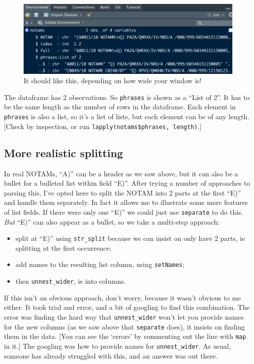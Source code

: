 \documentclass[
]{book}
\providecommand{\tightlist}{%
  \setlength{\itemsep}{0pt}\setlength{\parskip}{0pt}}
\begin{document}
\begin{figure}
\centering
\includegraphics{images/ListColumnInEnvironment.png}
\caption{It should like this, depending on how wide your window is!}
\end{figure}

The dataframe has 2 observations. So \texttt{phrases} is shown as a ``List of 2''. It has to be the same length as the number of rows in the dataframe. Each element in \texttt{phrases} is also a list, so it's a list of lists, but each element can be of any length. {[}Check by inspection, or run \texttt{lapply(notams\$phrases,\ length)}.{]}

\hypertarget{more-realistic-splitting}{%
\subsection{More realistic splitting}\label{more-realistic-splitting}}

In real NOTAMs, ``A)'' can be a header as we saw above, but it can also be a bullet for a bulleted list within field ``E)''. After trying a number of approaches to parsing this, I've opted here to split the NOTAM into 2 parts at the first ``E)'' and handle them separately. In fact it allows me to illustrate some more features of list fields. If there were only one ``E)'' we could just use \texttt{separate} to do this. \emph{But} ``E)'' can also appear as a bullet, so we take a multi-step approach:

\begin{itemize}
\tightlist
\item
  split at ``E)'' using \texttt{str\_split} because we can insist on only have 2 parts, ie splitting at the first occurrence;
\item
  add names to the resulting list column, using \texttt{setNames};
\item
  then \texttt{unnest\_wider}, ie into columns.
\end{itemize}

If this isn't an obvious approach, don't worry, because it wasn't obvious to me either. It took trial and error, and a bit of googling to find this combination. The error was finding the hard way that \texttt{unnest\_wider} won't let you provide names for the new columns (as we saw above that \texttt{separate} does), it insists on finding them in the data. {[}You can see the `errors' by commenting out the line with \texttt{map} in it.{]} The googling was how to provide names for \texttt{unnest\_wider}. As usual, someone has already struggled with this, and an answer was out there.
\end{document}
